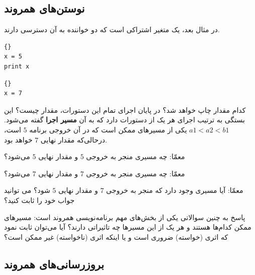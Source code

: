 \documentclass{book}
\begin{document}
\subsection {نوستن‌های همروند}
در مثال بعد،  یک متغیر اشتراکی است که دو خواننده به آن دسترسی دارند. 

\begin{latin}
\begin{minipage}[t]{2in}
\begin{latin}
\begin{lstlisting}[title=\rl{نخ \lr{A}}]{}
x = 5
print x
\end{lstlisting}
\end{latin}
\end{minipage}
\hfill
\begin{minipage}[t]{2in}
\begin{latin}
\begin{lstlisting}[title=\rl{نخ \lr{B}}]{}
x = 7
\end{lstlisting}
\end{latin}
\end{minipage}
\end{latin}

کدام مقدار  چاپ خواهد شد؟ در پایان اجرای تمام این دستورات، مقدار  چیست؟ 
این بستگی به ترتیب اجرای هر یک از دستورات دارد که به آن \textbf{مسیر اجرا} گفته می‌شود. 
$a1 < a2 < b1$ یکی از مسیرهای ممکن است که در آن خروجی برنامه 
\texttt{$5$} است، درحالی‌که مقدار نهایی \texttt{$7$} خواهد بود. 


معمّا: چه مسیری منجر به خروجی \texttt{$5$} و مقدار نهایی \texttt{$5$} می‌شود؟

معمّا: چه مسیری منجر به خروجی \texttt{$7$} و مقدار نهایی \texttt{$7$} می‌شود؟

معمّا: آیا مسیری وجود دارد که منجر به خروجی \texttt{$7$} و مقدار نهایی \texttt{$5$} شود؟ می توانید جواب خود را ثابت کنید؟

پاسخ به چنین سوالاتی یکی از بخش‌های مهم برنامه‌نویسی همروند است: مسیرهای ممکن کدام‌ها هستند و هر یک از این مسیرها چه تاثیراتی دارند؟ 
    آیا می‌توان ثابت نمود که اثری (خواسته) ضروری است و یا اینکه اثری (ناخواسته) غیر ممکن است؟


\subsection {بروزرسانی‌های همروند}
\end{document}

